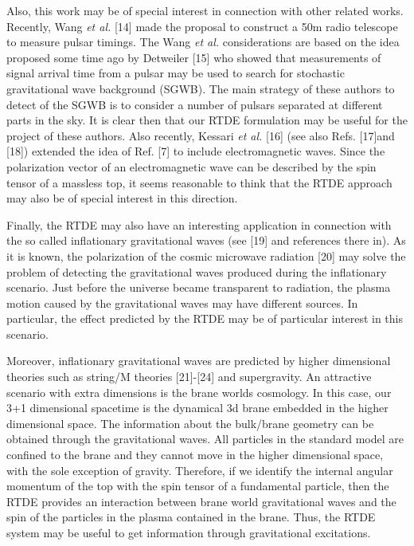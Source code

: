 \documentclass[a4paper,12pt]{article}
\begin{document}
Also, this work may be of special interest in connection with other related
works. Recently, Wang \textit{et al.} [14] made the proposal to construct a
50m radio telescope to measure pulsar timings. The Wang \textit{et al.}
considerations are based on the idea proposed some time ago by Detweiler
[15] who showed that measurements of signal arrival time from a pulsar may
be used to search for stochastic gravitational wave background (SGWB). The
main strategy of these authors to detect of the SGWB is to consider a number
of pulsars separated at different parts in the sky. It is clear then that
our RTDE formulation may be useful for the project of these authors. Also
recently, Kessari \textit{et al.} [16] (see also Refs. [17]and [18])
extended the idea of Ref. [7] to include electromagnetic waves. Since the
polarization vector of an electromagnetic wave can be described by the spin
tensor of a massless top, it seems reasonable to think that the RTDE
approach may also be of special interest in this direction.

Finally, the RTDE may also have an interesting application in connection
with the so called inflationary gravitational waves (see [19] and references
there in). As it is known, the polarization of the cosmic microwave
radiation [20] may solve the problem of detecting the gravitational waves
produced during the inflationary scenario. Just before the universe became
transparent to radiation, the plasma motion caused by the gravitational
waves may have different sources. In particular, the effect predicted by the
RTDE may be of particular interest in this scenario.

Moreover, inflationary gravitational waves are predicted by higher
dimensional theories such as string/M theories [21]-[24] and supergravity.
An attractive scenario with extra dimensions is the brane worlds cosmology.
In this case, our 3+1 dimensional spacetime is the dynamical 3d brane
embedded in the higher dimensional space. The information about the
bulk/brane geometry can be obtained through the gravitational waves. All
particles in the standard model are confined to the brane and they cannot
move in the higher dimensional space, with the sole exception of gravity.
Therefore, if we identify the internal angular momentum of the top with the
spin tensor of a fundamental particle, then the RTDE provides an interaction
between brane world gravitational waves and the spin of the particles in the
plasma contained in the brane. Thus, the RTDE system may be useful to get
information through gravitational excitations.
\end{document}
